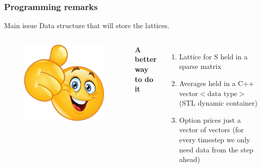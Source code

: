 \documentclass{beamer}
\begin{document}
\begin{frame}
\frametitle{Programming remarks}

\begin{block}{Main issue}
Data structure that will store the lattices.
\end{block}
\vspace{10mm}

\begin{columns}[b] %

\begin{figure}
	\includegraphics[scale=0.13]{yes}
\end{figure}

\textbf{A better way to do it}
\begin{enumerate}
\item Lattice for S held in a sparse matrix
\item Averages held in a C++ vector$<\text{data type}>$ (STL dynamic container)
\item Option prices just a vector of vectors (for every timestep we only need data from the step ahead)
\end{enumerate}

\end{columns}
\end{frame}
\end{document}
